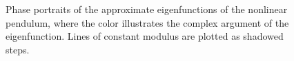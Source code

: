 \begin{figure}[h]
{        \hspace*{\fill}}
        \caption{Phase portraits of the approximate eigenfunctions of the nonlinear pendulum, where the color illustrates the complex argument of the eigenfunction. Lines of constant modulus are plotted as shadowed steps.}
        \label{pendulum_phase_portraits}
\end{figure}

